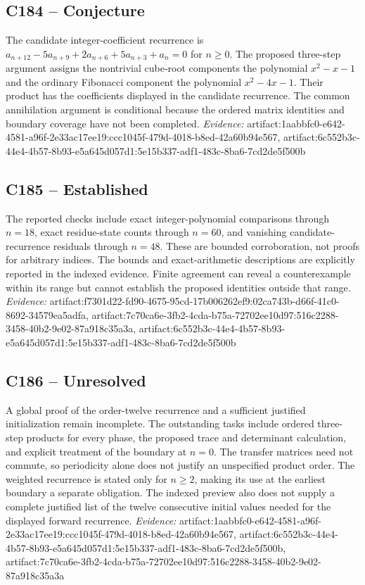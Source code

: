 \documentclass[11pt]{article}
\begin{document}
\subsection{C184 -- Conjecture}
The candidate integer-coefficient recurrence is $a_{n+12}-5a_{n+9}+2a_{n+6}+5a_{n+3}+a_n=0$ for $n\geq0$.
The proposed three-step argument assigns the nontrivial cube-root components the polynomial $x^2-x-1$ and the ordinary Fibonacci component the polynomial $x^2-4x-1$. Their product has the coefficients displayed in the candidate recurrence. The common annihilation argument is conditional because the ordered matrix identities and boundary coverage have not been completed.
\textit{Evidence: }artifact:1aabbfc0-e642-4581-a96f-2e33ac17ee19:ccc1045f-479d-4018-b8ed-42a60b94e567, artifact:6c552b3c-44e4-4b57-8b93-e5a645d057d1:5e15b337-adf1-483c-8ba6-7cd2de5f500b
\subsection{C185 -- Established}
The reported checks include exact integer-polynomial comparisons through $n=18$, exact residue-state counts through $n=60$, and vanishing candidate-recurrence residuals through $n=48$. These are bounded corroboration, not proofs for arbitrary indices.
The bounds and exact-arithmetic descriptions are explicitly reported in the indexed evidence. Finite agreement can reveal a counterexample within its range but cannot establish the proposed identities outside that range.
\textit{Evidence: }artifact:f7301d22-fd90-4675-95cd-17b006262ef9:02ca743b-d66f-41c0-8692-34579ea5adfa, artifact:7c70ca6e-3fb2-4cda-b75a-72702ee10d97:516c2288-3458-40b2-9e02-87a918c35a3a, artifact:6c552b3c-44e4-4b57-8b93-e5a645d057d1:5e15b337-adf1-483c-8ba6-7cd2de5f500b
\subsection{C186 -- Unresolved}
A global proof of the order-twelve recurrence and a sufficient justified initialization remain incomplete. The outstanding tasks include ordered three-step products for every phase, the proposed trace and determinant calculation, and explicit treatment of the boundary at $n=0$.
The transfer matrices need not commute, so periodicity alone does not justify an unspecified product order. The weighted recurrence is stated only for $n\geq2$, making its use at the earliest boundary a separate obligation. The indexed preview also does not supply a complete justified list of the twelve consecutive initial values needed for the displayed forward recurrence.
\textit{Evidence: }artifact:1aabbfc0-e642-4581-a96f-2e33ac17ee19:ccc1045f-479d-4018-b8ed-42a60b94e567, artifact:6c552b3c-44e4-4b57-8b93-e5a645d057d1:5e15b337-adf1-483c-8ba6-7cd2de5f500b, artifact:7c70ca6e-3fb2-4cda-b75a-72702ee10d97:516c2288-3458-40b2-9e02-87a918c35a3a
\end{document}
